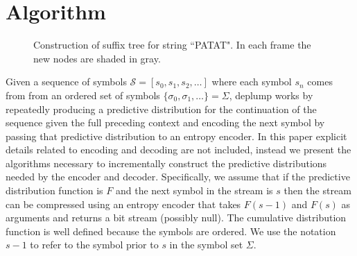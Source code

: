 \section{Algorithm}
\newcommand{\T}{\ensuremath{\mathcal{T}}}
\newcommand{\N}{\ensuremath{\mathcal{N}}}
\newcommand{\M}{\ensuremath{\mathcal{M}}}
\newcommand{\PP}{\ensuremath{\mathcal{P}}}
\newcommand{\nc}{\ensuremath{nc}}
\newcommand{\RS}{\ensuremath{\mathcal{R}\mathcal{S}}}
\newcommand{\D}{\ensuremath{\mathcal{D}}}
\newcommand{\la}{\ensuremath{\leftarrow}}
\newcommand{\G}{\ensuremath{\mathcal{G}}}
\newcommand{\IS}{\ensuremath{\mathcal{I}\mathcal{S}}}
\newcommand{\Seq}{\ensuremath{\mathcal{S}}}
\newcommand{\dd}{\ensuremath{\delta}}
%
\begin{figure}[t] 
	\begin{center}
		\caption{Construction of suffix tree for string ``PATAT".  In each frame the new nodes are shaded in gray.}
		\label{fig:suffix_tree}
	\end{center} 
\end{figure} 
%
Given a sequence of symbols $\Seq = [s_0, s_1, s_2, \ldots]$ where each symbol $s_n$ comes from from an ordered set of symbols $\{\sigma_0, \sigma_1, \ldots\} = \Sigma$,  deplump works by repeatedly producing a predictive distribution for the continuation of the sequence given the full preceding context and encoding the next symbol by passing that predictive distribution to an entropy encoder.  In this paper explicit details related to encoding and decoding are not included, instead we present the algorithms necessary to incrementally construct the predictive distributions needed by the encoder and decoder.  Specifically, we assume that if the predictive distribution function is $F$ and the next symbol in the stream is $s$ then the stream can be compressed using an entropy encoder that takes $F(s-1)$ and $F(s)$ as arguments and returns a bit stream (possibly null)\citep{Witten1987,arithmeticencoding}.   The cumulative distribution function is well defined because the symbols are ordered. We use the notation $s-1$ to refer to the symbol prior to $s$ in the symbol set $\Sigma$.  %

